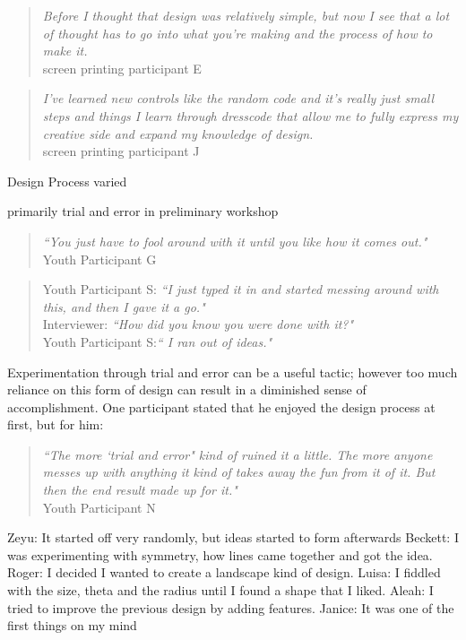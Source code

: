 \documentclass{sigchi}
\begin{document}
\begin{quotation}
	\textit{Before I thought that design was relatively simple, but now I see that a lot of thought has to go into what you're making and the process of how to make it.}
		\\screen printing participant E
	\end{quotation}

\begin{quotation}
	\textit{I've learned new controls like the random code and it's really just small steps and things I learn through dresscode that allow me to fully express my creative side and expand my knowledge of design.}
	\\screen printing participant J
\end{quotation}

Design Process varied 

primarily trial and error in preliminary workshop
\begin{quotation}
\textit{``You just have to fool around with it until you like how it comes out."}
\\Youth Participant G
\end{quotation}

\begin{quotation}
Youth Participant S: \textit{``I just typed it in and started messing around with this, and then I gave it a go."}
\\Interviewer: \textit{``How did you know you were done with it?"}
\\Youth Participant S:\textit{`` I ran out of ideas."} 
\end{quotation}

Experimentation through trial and error can be a useful tactic; however too much reliance on this form of design can result in a diminished sense of accomplishment. One participant stated that he enjoyed the design process at first, but for him:

	 \begin{quotation}
	  \textit{``The more `trial and error" kind of ruined it a little. The more anyone messes up with anything it kind of takes away the fun from it of it. But then the end result made up for it."} \\Youth Participant N
	 \end{quotation}

Zeyu: It started off very randomly, but ideas started to form afterwards
Beckett: I was experimenting with symmetry, how lines came together and got the idea.
Roger: I decided I wanted to create a landscape kind of design.
Luisa: I fiddled with the size, theta and the radius until I found a shape that I liked.
Aleah: I tried to improve the previous design by adding features.
Janice: It was one of the first things on my mind
\end{document}
